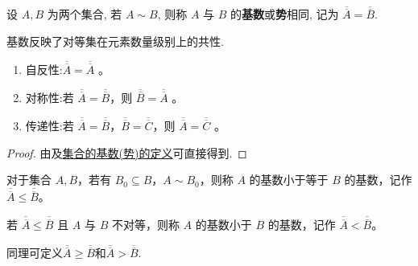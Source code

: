 \documentclass[../../main.tex]{subfiles}%
\begin{document}
\begin{definition}[集合的基数(势)]\label{definition:集合的基数(势)}
设 $A, B$ 为两个集合, 若 $A \sim B$, 则称 $A$ 与 $B$ 的\textbf{基数}或\textbf{势}相同, 记为 $\overline{\overline{A}} = \overline{\overline{B}}$.
\end{definition}
\begin{note}
基数反映了对等集在元素数量级别上的共性. 
\end{note}

\begin{theorem}
\begin{enumerate}[(1)]
\item 自反性:$\overline{\overline{A}} = \overline{\overline{A}}$ 。

\item 对称性:若 $\overline{\overline{A}} = \overline{\overline{B}}$，则 $\overline{\overline{B}} = \overline{\overline{A}}$ 。

\item 传递性:若 $\overline{\overline{A}} = \overline{\overline{B}}$，$\overline{\overline{B}} = \overline{\overline{C}}$，则 $\overline{\overline{A}} = \overline{\overline{C}}$ 。
\end{enumerate}
\end{theorem}
\begin{proof}
由及\hyperref[definition:集合的基数(势)]{集合的基数(势)的定义}可直接得到.
\end{proof}

\begin{definition}\label{definition:集合的基数大小关系}
对于集合 $A, B$，若有 $B_0 \subseteq B$，$A \sim B_0$，则称 $A$ 的基数小于等于 $B$ 的基数，记作 $\overline{\overline{A}} \leqslant\overline{\overline{B}}$。

若 $\overline{\overline{A}}\leqslant \overline{\overline{B}}$ 且 $A$ 与 $B$ 不对等，则称 $A$ 的基数小于 $B$ 的基数，记作 $\overline{\overline{A}} < \overline{\overline{B}}$。

同理可定义$\overline{\overline{A}}\geqslant \overline{\overline{B}}$和$\overline{\overline{A}}> \overline{\overline{B}}$.
\end{definition}
\end{document}
